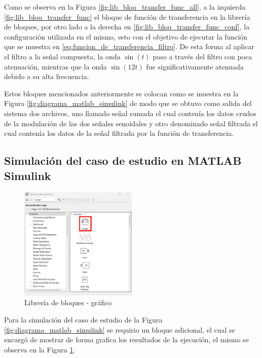Como se observa en la Figura \ref{fig:lib_bloq_transfer_func_all}, a la izquierda \ref{fig:lib_bloq_transfer_func} el bloque de función de transferencia en la librería de bloques, por otro lado a la derecha en \ref{fig:lib_bloq_transfer_func_conf},  la configuración utilizada en el mismo, esto con el objetivo de ejecutar la función que se muestra en \ref{eq:funcion_de_transferencia_filtro}. De esta forma al aplicar el filtro a la señal compuesta,  la onda $\sin(t)$ paso a través del filtro con poca atenuación, mientras que la onda $\sin(12t)$ fue significativamente atenuada debido a su  alta frecuencia.

Estos bloques mencionados anteriormente se colocan como se muestra en la Figura \ref{fig:diagrama_matlab_simulink} de modo que se obtuvo como salida del sistema dos archivos, uno llamado señal sumada el cual contenía los datos crudos de la modulación de las dos señales senoidales y otro denominado señal filtrada el cual contenía los datos de la señal filtrada por la función de transferencia.

\newpage

\subsection{Simulación del caso de estudio en MATLAB Simulink}\label{subsec:simulacion_caso_de_estudio}

\begin{figure}[h!]
    \centering
    \includegraphics[width=0.5\textwidth]{fig/especifico_2/CASO_ESTUDIO_FILTRO/scope_0.pdf}
    \caption{Librería de bloques - gráfico}
    \label{fig:lib_bloq_graph}
\end{figure}

Para la simulación del caso de estudio de la Figura \ref{fig:diagrama_matlab_simulink} se requirio un bloque adicional, el cual se encargó de mostrar de forma grafica los resultados de la ejecución, el mismo se observa en la Figura \ref{fig:lib_bloq_graph}.

